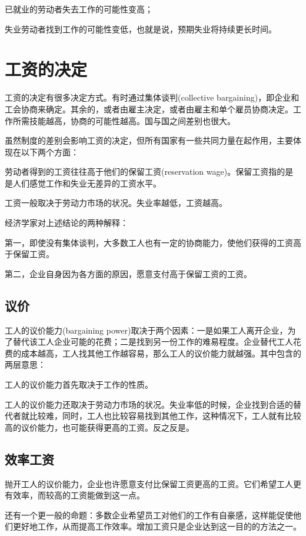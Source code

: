 \documentclass{article}
\begin{document}
已就业的劳动者失去工作的可能性变高；

失业劳动者找到工作的可能性变低，也就是说，预期失业将持续更长时间。

\section{工资的决定}

工资的决定有很多决定方式。有时通过集体谈判(collective bargaining)，即企业和工会协商来确定。其余的，或者由雇主决定，或者由雇主和单个雇员协商决定。工作所需技能越高，协商的可能性越高。国与国之间差别也很大。

虽然制度的差别会影响工资的决定，但所有国家有一些共同力量在起作用，主要体现在以下两个方面：

劳动者得到的工资往往高于他们的保留工资(reservation wage)。保留工资指的是是人们感觉工作和失业无差异的工资水平。

工资一般取决于劳动力市场的状况。失业率越低，工资越高。

\hspace*{\fill}

经济学家对上述结论的两种解释：

第一，即使没有集体谈判，大多数工人也有一定的协商能力，使他们获得的工资高于保留工资。

第二，企业自身因为各方面的原因，愿意支付高于保留工资的工资。

\subsection{议价}

工人的议价能力(bargaining power)取决于两个因素：一是如果工人离开企业，为了替代该工人企业可能的花费；二是找到另一份工作的难易程度。企业替代工人花费的成本越高，工人找其他工作越容易，那么工人的议价能力就越强。其中包含的两层意思：

工人的议价能力首先取决于工作的性质。

工人的议价能力还取决于劳动力市场的状况。失业率低的时候，企业找到合适的替代者就比较难，同时，工人也比较容易找到其他工作，这种情况下，工人就有比较高的议价能力，也可能获得更高的工资。反之反是。

\subsection{效率工资}

抛开工人的议价能力，企业也许愿意支付比保留工资更高的工资。它们希望工人更有效率，而较高的工资能做到这一点。

还有一个更一般的命题：多数企业希望员工对他们的工作有自豪感，这样能促使他们更好地工作，从而提高工作效率。增加工资只是企业达到这一目的的方法之一。
\end{document}

